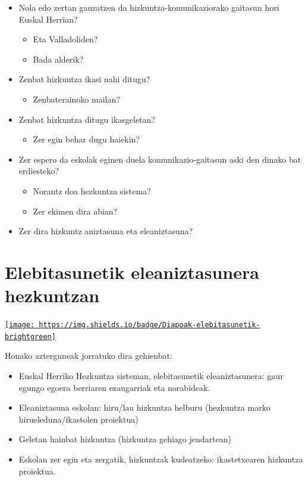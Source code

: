 \documentclass[
]{book}
\providecommand{\tightlist}{%
  \setlength{\itemsep}{0pt}\setlength{\parskip}{0pt}}
\begin{document}
\begin{itemize}
\tightlist
\item
  Nola edo zertan gauzatzen da hizkuntza-komunikaziorako gaitasun hori Euskal Herrian?

  \begin{itemize}
  \tightlist
  \item
    Eta Valladoliden?
  \item
    Bada alderik?
  \end{itemize}
\item
  Zenbat hizkuntza ikasi nahi ditugu?

  \begin{itemize}
  \tightlist
  \item
    Zenbaterainoko mailan?
  \end{itemize}
\item
  Zenbat hizkuntza ditugu ikasgeletan?

  \begin{itemize}
  \tightlist
  \item
    Zer egin behar dugu haiekin?
  \end{itemize}
\item
  Zer espero da eskolak eginen duela komunikazio-gaitasun aski den dinako bat erdiesteko?

  \begin{itemize}
  \tightlist
  \item
    Norantz doa hezkuntza sistema?
  \item
    Zer ekimen dira abian?
  \end{itemize}
\item
  Zer dira hizkuntz aniztasuna eta eleaniztasuna?
\end{itemize}

\hypertarget{elebitasunetik-eleaniztasunera-hezkuntzan}{%
\chapter{Elebitasunetik eleaniztasunera hezkuntzan}\label{elebitasunetik-eleaniztasunera-hezkuntzan}}

\href{../diapoak/02-HDIBelebiDiapo.html}{\texttt{[image: https://img.shields.io/badge/Diapoak-elebitasunetik-brightgreen]}}

Honako azterguneak jorratuko dira gehienbat:

\begin{itemize}
\tightlist
\item
  Euskal Herriko Hezkuntza sisteman, elebitasunetik eleaniztasunera: gaur egungo egoera berriaren ezaugarriak eta norabideak.
\item
  Eleaniztasuna eskolan: hiru/lau hizkuntza helburu (hezkuntza marko hirueleduna/ikastolen proiektua)
\item
  Geletan hainbat hizkuntza (hizkuntza gehiago jendartean)
\item
  Eskolan zer egin eta zergatik, hizkuntzak kudeatzeko: ikastetxearen hizkuntza proiektua.
\end{itemize}
\end{document}
